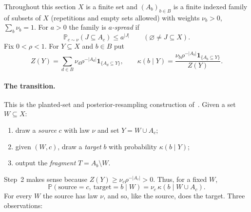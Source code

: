 \documentclass[11pt]{article}
\numberwithin{equation}{section}
\newcommand{\PP}{\mathbb P}
\newcommand{\ind}{\mathbf 1}
\begin{document}
Throughout this section $X$ is a finite set and $(A_b)_{b\in B}$ is a
finite indexed family of subsets of $X$ (repetitions and empty sets
allowed) with weights $\nu_b>0$, $\sum_b\nu_b=1$. For $a>0$ the family is
\emph{$a$-spread} if
\begin{equation}\label{eq:spread}
 \PP_{c\sim\nu}(J\subseteq A_c)\le a^{|J|}
 \qquad(\varnothing\ne J\subseteq X).
\end{equation}
Fix $0<\rho<1$. For $Y\subseteq X$ and $b\in B$ put
\begin{equation}\label{eq:posterior}
 Z(Y)=\sum_{d\in B}\nu_d\rho^{-|A_d|}\ind_{\{A_d\subseteq Y\}},
 \qquad
 \kappa(b\mid Y)=\frac{\nu_b\rho^{-|A_b|}\ind_{\{A_b\subseteq Y\}}}{Z(Y)}.
\end{equation}

\paragraph{The transition.}
This is the planted-set and posterior-resampling construction
of~\cite[Sections~2.1--2.3]{MNSZ25}. Given a set $W\subseteq X$:
\begin{enumerate}[label=\arabic*.,itemsep=1pt,topsep=3pt]
 \item draw a \emph{source} $c$ with law $\nu$ and set $Y=W\cup A_c$;
 \item given $(W,c)$, draw a \emph{target} $b$ with probability
 $\kappa(b\mid Y)$;
 \item output the \emph{fragment} $T=A_b\setminus W$.
\end{enumerate}
Step~2 makes sense because $Z(Y)\ge\nu_c\rho^{-|A_c|}>0$. Thus, for a
fixed $W$,
\begin{equation}\label{eq:joint}
 \PP(\mathrm{source}=c,\ \mathrm{target}=b\mid W)
 =\nu_c\,\kappa(b\mid W\cup A_c).
\end{equation}
For every $W$ the source has law $\nu$, and so, like the source, does the target.
Three observations:
\end{document}
